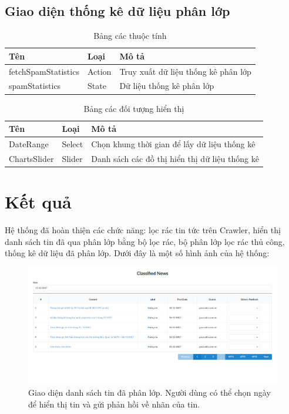   \subsection{Giao diện thống kê dữ liệu phân lớp}
  \begin{table}[H]
    \centering
    \setlength{\tabcolstep}{12pt}
    \begin{tabular}{@{}lll@{}} \toprule
      Tên  & Loại   & Mô tả \\ \midrule
      fetchSpamStatistics &  Action   &  Truy xuất dữ liệu thống kê phân lớp \\
      spamStatistics  &  State  & Dữ liệu thống kê phân lớp \\ \bottomrule
    \end{tabular}
    \caption{Bảng các thuộc tính}
  \end{table}

  \begin{table}[H]
    \centering
    \setlength{\tabcolstep}{12pt}
    \begin{tabular}{@{}lll@{}} \toprule
      Tên  & Loại   & Mô tả \\ \midrule
      DateRange   &  Select & Chọn khung thời gian để lấy dữ liệu thống kê \\
      ChartsSlider   & Slider &  Danh sách các đồ thị hiển thị dữ liệu thống kê \\ \bottomrule
    \end{tabular}
    \caption{Bảng các đối tượng hiển thị}
  \end{table}
\section{Kết quả}
Hệ thống đã hoàn thiện các chức năng: lọc rác tin tức trên Crawler, hiển thị danh sách tin đã qua phân lớp bằng bộ lọc rác, bộ phân lớp lọc rác thủ công, thống kê dữ liệu đã phân lớp. Dưới đây là một số hình ảnh của hệ thống:
\begin{figure}[H]
	\centering
	\includegraphics[width=1\linewidth]{Chapter3/Chapter3Figs/Classified.png}
	\caption{Giao diện danh sách tin đã phân lớp. Người dùng có thể chọn ngày để hiển thị tin và gửi phản hồi về nhãn của tin.}
	\label{fig:streaming}
\end{figure}

